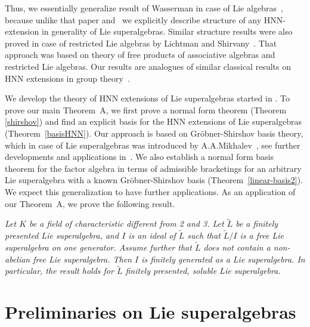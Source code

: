 \documentclass[12pt, reqno]{amsart}
\theoremstyle{remark}
\theoremstyle{definition}
\numberwithin{equation}{section}
\begin{document}
\medskip
Thus, we essentially generalize result of Wasserman in case of Lie algebras~\cite[Th.~5.1 and Cor.~5.3]{W}, 
because unlike that paper and~\cite{L-P-Z} we explicitly describe structure of any HNN-extension in generality of Lie superalgebras. 
Similar structure results were also proved in case of restricted Lie algebras by Lichtman and Shirvany~\cite[Proposition 1]{L-S}. %
That approach was based on theory of free products of associative algebras and restricted Lie algebras.
Our results are analogues of similar classical results on HNN extensions in group theory~\cite{HNN,LyndonShupp}.

We develop the theory of HNN extensions of Lie superalgebras started in \cite{L-P-Z,L-S}. 
To prove our main Theorem~A, we first prove a normal form theorem (Theorem \ref{shirshov})
and find an explicit basis for the HNN extensions of Lie superalgebras (Theorem~\ref{basisHNN}).
Our approach is based on Gr\"obner-Shirshov basis theory, which in case of Lie superalgebras was introduced
by A.A.Mikhalev~\cite{M89}, see further developments and  applications in~\cite{BMPZ,B-K-L-M,Men25}.
We also establish a normal form basis theorem for the factor algebra in terms of admissible bracketings 
for an arbitrary Lie superalgebra with a known Gr\"obner-Shirshov basis (Theorem~\ref{linear-basis2}). 
We expect this generalization to have further applications. 
As an application of our Theorem~A, we prove the following result.


\medskip
{} {\it  Let $K$ be a field of characteristic different from 2 and 3.
Let $\widetilde{L}$ be a finitely presented Lie superalgebra, 
and {  $I$ is an ideal of $\widetilde L$}  such that $\widetilde{L}/ I$ is a free Lie superalgebra on one generator. 
Assume further that $\widetilde{L}$ does not contain  a non-abelian free Lie superalgebra.  
Then $I$ is finitely generated as a Lie superalgebra. In particular, 
the result holds for $\widetilde{L}$ finitely presented, soluble Lie superalgebra.
}
\medskip



\section{Preliminaries on Lie superalgebras}
\end{document}
